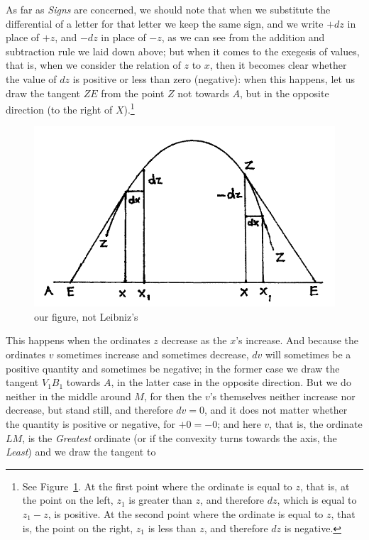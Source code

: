 \documentclass[polutonikogreek,english,twoside,openright]{article}
\begin{document}
As far as {\em Signs} are concerned, we should note that when we
substitute the differential of a letter for that letter we keep the
same sign, and we write $+dz$ in place of $+z$, and $-dz$ in place of
$-z$, as we can see from the addition and subtraction rule we laid
down above; but when it comes to the exegesis of values, that is, when
we consider the relation of $z$ to $x$, then it becomes clear whether
the value of $dz$ is positive or less than zero (negative): when this
happens, let us draw the tangent $ZE$ from the point $Z$ not towards
$A$, but in the opposite direction (to the right of $X$).\footnote{See
  Figure~\ref{incrdecr}.  At the first point where the ordinate is
  equal to $z$, that is, at the point on the left, $z_1$ is greater
  than $z$, and therefore $dz$, which is equal to $z_1 -z$, is
  positive.  At the second point where the ordinate is equal to $z$,
  that is, the point on the right, $z_1$ is less than $z$, and
  therefore $dz$ is negative.}
\begin{figure}[htp]
  \begin{center}
    \includegraphics[width=.75\textwidth]{fig/Figure4}
    \caption{our figure, not Leibniz's}
    \label{incrdecr}
  \end{center}
\end{figure}
This happens when the ordinates $z$ decrease as the $x$'s increase.
And because the ordinates $v$ sometimes increase and sometimes
decrease, $dv$ will sometimes be a positive quantity and sometimes be
negative; in the former case we draw the tangent $V_1B_1$ towards $A$,
in the latter case in the opposite direction.
\label{dvzero}
But we do neither in the middle around $M$, for then the $v$'s
themselves neither increase nor decrease, but stand still, and
therefore $dv = 0$, and it does not matter whether the quantity is
positive or negative, for $+0 = -0$; and here $v$, that is, the
ordinate $LM$, is the {\em Greatest} ordinate (or if the convexity
turns towards the axis, the {\em Least}) and we draw the tangent to
\end{document}
